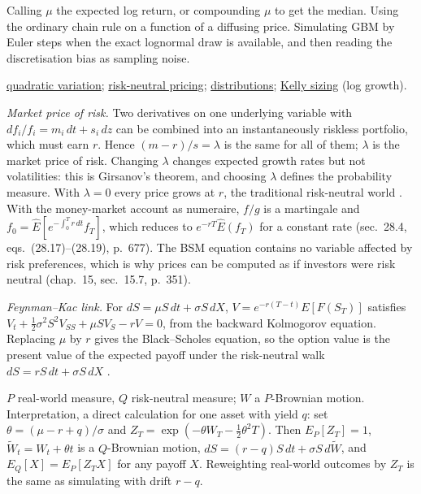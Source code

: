 \begin{qfresult}
 Calling $\mu$ the expected log return, or compounding $\mu$ to get the median. Using the ordinary chain rule on a function of a diffusing price. Simulating GBM by Euler steps when the exact lognormal draw is available, and then reading the discretisation bias as sampling noise.

 \hyperref[def:brownian-motion-quadratic-variation]{quadratic variation}; \hyperref[res:risk-neutral-pricing-feynman-kac]{risk-neutral pricing}; \hyperref[def:financial-distributions]{distributions}; \hyperref[res:kelly-growth-optimal-fraction]{Kelly sizing} (log growth).

\end{qfresult}

\begin{qfresult}\label{res:risk-neutral-pricing-feynman-kac}
 \emph{Market price of risk.} Two derivatives on one underlying variable with $df_i/f_i=m_i\,dt+s_i\,dz$ can be combined into an instantaneously riskless portfolio, which must earn $r$. Hence $(m-r)/s=\lambda$ is the same for all of them; $\lambda$ is the market price of risk. Changing $\lambda$ changes expected growth rates but not volatilities: this is Girsanov's theorem, and choosing $\lambda$ defines the probability measure. With $\lambda=0$ every price grows at $r$, the traditional risk-neutral world \citep[chap.~28, sec.~28.1, eqs.~(28.6)--(28.10), pp.~671--674]{s7-hulloptions}. With the money-market account as numeraire, $f/g$ is a martingale and $f_0=\hat E[e^{-\int_0^Tr\,dt}f_T]$, which reduces to $e^{-rT}\hat E(f_T)$ for a constant rate (sec.~28.4, eqs.~(28.17)--(28.19), p.~677). The BSM equation contains no variable affected by risk preferences, which is why prices can be computed as if investors were risk neutral (chap.~15, sec.~15.7, p.~351).

\emph{Feynman--Kac link.} For $dS=\mu S\,dt+\sigma S\,dX$, $V=e^{-r(T-t)}E[F(S_T)]$ satisfies $V_t+\tfrac12\sigma^2S^2V_{SS}+\mu SV_S-rV=0$, from the backward Kolmogorov equation. Replacing $\mu$ by $r$ gives the Black--Scholes equation, so the option value is the present value of the expected payoff under the risk-neutral walk $dS=rS\,dt+\sigma S\,dX$ \citep[chap.~10, sec.~10.11, eqs.~(10.6)--(10.8), pp.~179--180]{wide-wilmott-pwoqf}.

 $P$ real-world measure, $Q$ risk-neutral measure; $W$ a $P$-Brownian motion. Interpretation, a direct calculation for one asset with yield $q$: set $\theta=(\mu-r+q)/\sigma$ and $Z_T=\exp(-\theta W_T-\tfrac12\theta^2T)$. Then $E_P[Z_T]=1$, $\tilde W_t=W_t+\theta t$ is a $Q$-Brownian motion, $dS=(r-q)S\,dt+\sigma S\,d\tilde W$, and $E_Q[X]=E_P[Z_TX]$ for any payoff $X$. Reweighting real-world outcomes by $Z_T$ is the same as simulating with drift $r-q$.


\end{qfresult}
